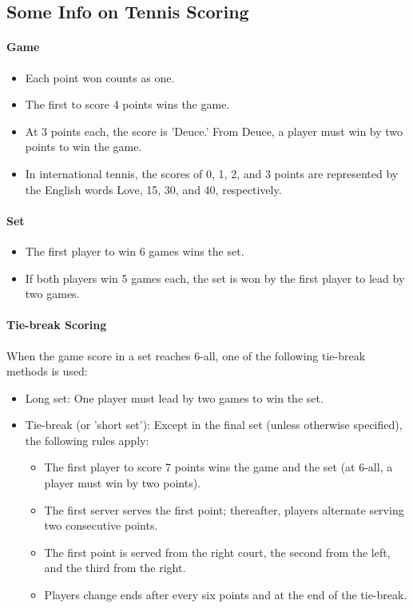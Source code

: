 \documentclass[11pt,a4paper]{article}
\begin{document}
	\subsection{Some Info on Tennis Scoring}
	\paragraph{Game}
	\begin{itemize}
		\item Each point won counts as one. 
		\item The first to score 4 points wins the game.
		\item At 3 points each, the score is 'Deuce.' From Deuce, a player must win by two points to win the game. 
		\item In international tennis, the scores of 0, 1, 2, and 3 points are represented by the English words Love, 15, 30, and 40, respectively.
	\end{itemize}
		
	\paragraph{Set}
	\begin{itemize}
		\item The first player to win 6 games wins the set.
		\item If both players win 5 games each, the set is won by the first player to lead by two games.
	\end{itemize}
		
	\paragraph{Tie-break Scoring}
	When the game score in a set reaches 6-all, one of the following tie-break methods is used:
	\begin{itemize}
		\item Long set: One player must lead by two games to win the set.
		\item Tie-break (or 'short set'): Except in the final set (unless otherwise specified), the following rules apply:
		\begin{itemize}
			\item The first player to score 7 points wins the game and the set (at 6-all, a player must win by two points).
			\item The first server serves the first point; thereafter, players alternate serving two consecutive points.
			\item The first point is served from the right court, the second from the left, and the third from the right.
			\item Players change ends after every six points and at the end of the tie-break.
		\end{itemize}
	\end{itemize}
		
\end{document}
